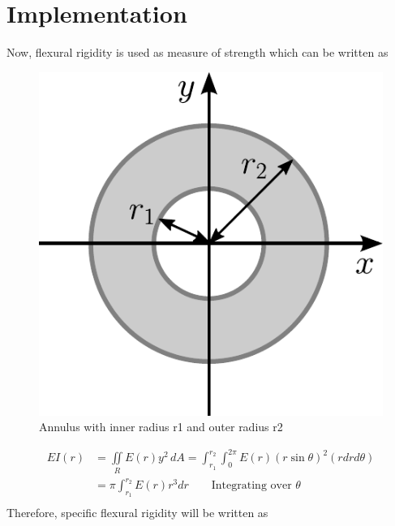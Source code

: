 \documentclass[openright,twoside]{iitkthesis}
\begin{document}
\section{Implementation}
Now, flexural rigidity is used as measure of strength which can be written as 
\begin{figure}
\begin{center}
\includegraphics[scale=0.3]{moment_annulus}
\caption{Annulus with inner radius r1 and outer radius r2}
\end{center}
\end{figure}
\begin{equation}
\begin{split}
EI(r) &= \underset{R}{\iint}E(r)y^2\,dA = \int_{r_1}^{r_2}\int_0^{2\pi} E(r)(r\sin\theta)^2(rdrd\theta)\\
&= \pi\int_{r_1}^{r_2} E(r)r^3 dr \qquad \text{Integrating over $\theta$}\\
\end{split}
\end{equation}
Therefore, specific flexural rigidity will be written as
\end{document}
